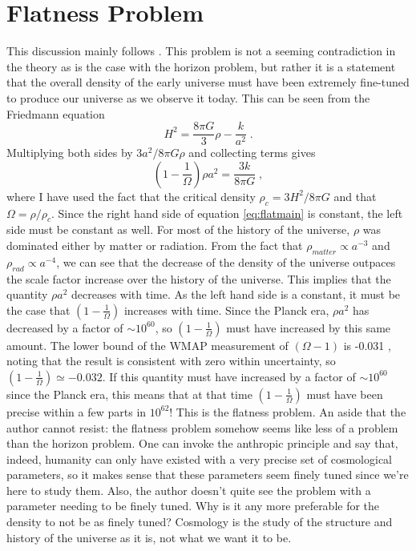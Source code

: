 \documentclass[aps,reprint,prl]{revtex4-1}
\begin{document}
\section*{Flatness Problem}
This discussion mainly follows \cite{masters,wiki:flatness}. This problem is not a seeming contradiction in the theory as is the case with the horizon problem, but rather it is a statement that the overall density of the early universe must have been extremely fine-tuned to produce our universe as we observe it today.  This can be seen from the Friedmann equation
\begin{equation}
H^2=\frac{8\pi G}{3}\rho-\frac{k}{a^2}\;.
\end{equation}
Multiplying both sides by $3a^2/8\pi G \rho$ and collecting terms gives
\begin{equation} \label{eq:flatmain}
\left(1-\frac{1}{\Omega}\right)\rho a^2=\frac{3k}{8\pi G}\;,
\end{equation}
where I have used the fact that the critical density $\rho_c=3H^2/8\pi G$ and that $\Omega=\rho/\rho_c$.  Since the right hand side of equation \ref{eq:flatmain} is constant, the left side must be constant as well.  For most of the history of the universe, $\rho$ was dominated either by matter or radiation.  From the fact that $\rho_{matter}\propto a^{-3}$ and $\rho_{rad}\propto a^{-4}$, we can see that the decrease of the density of the universe outpaces the scale factor increase over the history of the universe.  This implies that the quantity $\rho a^2$ decreases with time.  As the left hand side is a constant, it must be the case that $\left(1-\frac{1}{\Omega}\right)$ increases with time. Since the Planck era, $\rho a^2$ has decreased by a factor of $\sim 10^{60}$, so $\left(1-\frac{1}{\Omega}\right)$ must have increased by this same amount.  The lower bound of the WMAP measurement of $\left(\Omega-1\right)$ is -0.031 \cite{WMAP}, noting that the result is consistent with zero within uncertainty, so $\left(1-\frac{1}{\Omega}\right)\simeq-0.032$.  If this quantity must have increased by a factor of $\sim 10^{60}$ since the Planck era, this means that at that time $\left(1-\frac{1}{\Omega}\right)$ must have been precise within a few parts in $10^{62}$!  This is the flatness problem.  An aside that the author cannot resist: the flatness problem somehow seems like less of a problem than the horizon problem.  One can invoke the anthropic principle and say that, indeed, humanity can only have existed with a very precise set of cosmological parameters, so it makes sense that these parameters seem finely tuned since we're here to study them.  Also, the author doesn't quite see the problem with a parameter needing to be finely tuned.  Why is it any more preferable for the density to not be as finely tuned?  Cosmology is the study of the structure and history of the universe as it is, not what we want it to be.
\end{document}
